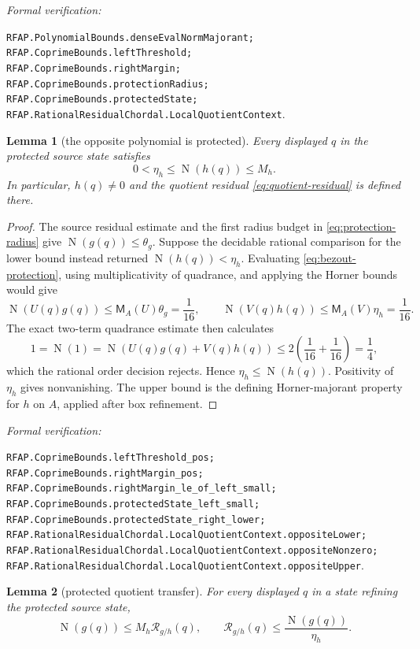 \documentclass[11pt]{article}
\newtheorem{lemma}[lemma]{Lemma}
\newcommand{\Norm}[1]{\operatorname{N}\!\left(#1\right)}
\newcommand{\leanref}[1]{\par\smallskip\noindent
  \emph{Formal verification:}\par\nobreak
  {\raggedright\nolinkurl{#1}.\par}}
\begin{document}
\leanref{RFAP.PolynomialBounds.denseEvalNormMajorant;
RFAP.CoprimeBounds.leftThreshold;
RFAP.CoprimeBounds.rightMargin;
RFAP.CoprimeBounds.protectionRadius;
RFAP.CoprimeBounds.protectedState;
RFAP.RationalResidualChordal.LocalQuotientContext}

\begin{lemma}[the opposite polynomial is protected]
\label{lem:opposite-protected}
Every displayed $q$ in the protected source state satisfies
\begin{equation}
\label{eq:opposite-bounds}
                    0<\eta_h\le\Norm{h(q)}\le M_h.
\end{equation}
In particular, $h(q)\ne0$ and the quotient residual
\eqref{eq:quotient-residual} is defined there.
\end{lemma}

\begin{proof}
The source residual estimate and the first radius budget in
\eqref{eq:protection-radius} give
$\Norm{g(q)}\le\theta_g$.  Suppose the decidable rational comparison for the
lower bound instead returned $\Norm{h(q)}<\eta_h$.  Evaluating
\eqref{eq:bezout-protection}, using multiplicativity of quadrance, and
applying the Horner bounds would give
\[
 \Norm{U(q)g(q)}\le\mathsf M_A(U)\theta_g=\frac1{16},
 \qquad
 \Norm{V(q)h(q)}\le\mathsf M_A(V)\eta_h=\frac1{16}.
\]
The exact two-term quadrance estimate then calculates
\[
 1=\Norm 1
  =\Norm{U(q)g(q)+V(q)h(q)}
 \le2\left(\frac1{16}+\frac1{16}\right)=\frac14,
\]
which the rational order decision rejects.  Hence
$\eta_h\le\Norm{h(q)}$.  Positivity of $\eta_h$ gives nonvanishing.  The
upper bound is the defining Horner-majorant property for $h$ on $A$, applied
after box refinement.
\end{proof}

\leanref{RFAP.CoprimeBounds.leftThreshold_pos;
RFAP.CoprimeBounds.rightMargin_pos;
RFAP.CoprimeBounds.rightMargin_le_of_left_small;
RFAP.CoprimeBounds.protectedState_left_small;
RFAP.CoprimeBounds.protectedState_right_lower;
RFAP.RationalResidualChordal.LocalQuotientContext.oppositeLower;
RFAP.RationalResidualChordal.LocalQuotientContext.oppositeNonzero;
RFAP.RationalResidualChordal.LocalQuotientContext.oppositeUpper}

\begin{lemma}[protected quotient transfer]
\label{lem:protected-quotient-transfer}
For every displayed $q$ in a state refining the protected source state,
\begin{equation}
\label{eq:quotient-transfer}
 \Norm{g(q)}\le M_h\mathcal R_{g/h}(q),
 \qquad
 \mathcal R_{g/h}(q)\le\frac{\Norm{g(q)}}{\eta_h}.
\end{equation}
\end{lemma}
\end{document}
